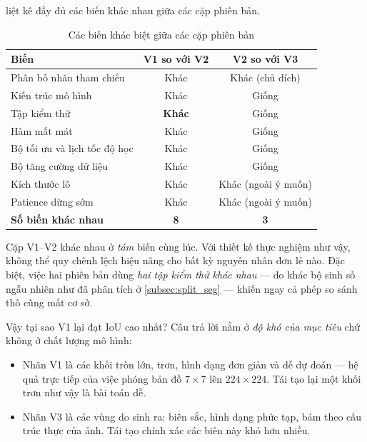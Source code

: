  liệt kê đầy đủ các biến khác nhau giữa các cặp phiên bản.

\begin{table}[H]
\centering
\caption{Các biến khác biệt giữa các cặp phiên bản}
\label{tab:confound}
\small
\begin{tabular}{L{5.0cm} c c}
\toprule
\textbf{Biến} & \textbf{V1 so với V2} & \textbf{V2 so với V3} \\
\midrule
Phân bố nhãn tham chiếu   & Khác & Khác (chủ đích) \\
Kiến trúc mô hình         & Khác & Giống \\
Tập kiểm thử              & \textbf{Khác} & Giống \\
Hàm mất mát               & Khác & Giống \\
Bộ tối ưu và lịch tốc độ học & Khác & Giống \\
Bộ tăng cường dữ liệu     & Khác & Giống \\
Kích thước lô             & Khác & Khác (ngoài ý muốn) \\
Patience dừng sớm         & Khác & Khác (ngoài ý muốn) \\
\midrule
\textbf{Số biến khác nhau} & \textbf{8} & \textbf{3} \\
\bottomrule
\end{tabular}
\end{table}

Cặp V1--V2 khác nhau ở \emph{tám} biến cùng lúc. Với thiết kế thực nghiệm như vậy,
không thể quy chênh lệch hiệu năng cho bất kỳ nguyên nhân đơn lẻ nào. Đặc biệt,
việc hai phiên bản dùng \emph{hai tập kiểm thử khác nhau} --- do khác bộ sinh số
ngẫu nhiên như đã phân tích ở \cref{subsec:split_seg} --- khiến ngay cả phép so
sánh thô cũng mất cơ sở.

Vậy tại sao V1 lại đạt IoU cao nhất? Câu trả lời nằm ở \emph{độ khó của mục tiêu}
chứ không ở chất lượng mô hình:

\begin{itemize}
    \item Nhãn V1 là các khối tròn lớn, trơn, hình dạng đơn giản và dễ dự đoán ---
          hệ quả trực tiếp của việc phóng bản đồ $7 \times 7$ lên $224 \times 224$.
          Tái tạo lại một khối trơn như vậy là bài toán dễ.
    \item Nhãn V3 là các vùng do \SAM{} sinh ra: biên sắc, hình dạng phức tạp, bám
          theo cấu trúc thực của ảnh. Tái tạo chính xác các biên này khó hơn nhiều.
\end{itemize}

